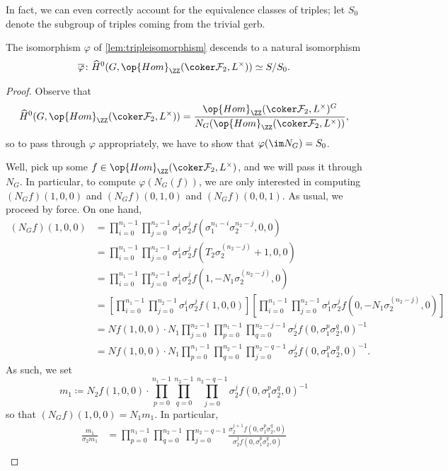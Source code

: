\documentclass{article}
\begin{document}
In fact, we can even correctly account for the equivalence classes of triples; let $S_0$ denote the subgroup of triples coming from the trivial gerb.
\begin{proposition}
	The isomorphism $\varphi$ of \autoref{lem:tripleisomorphism} descends to a natural isomorphism
	\[\overline\varphi\colon\widehat H^0(G,\op{Hom}_\ZZ(\coker\mathcal F_2,L^\times))\simeq S/S_0.\]
\end{proposition}
\begin{proof}
	Observe that
	\[\widehat H^0(G,\op{Hom}_\ZZ(\coker\mathcal F_2,L^\times))=\frac{\op{Hom}_\ZZ(\coker\mathcal F_2,L^\times)^G}{N_G(\op{Hom}_\ZZ(\coker\mathcal F_2,L^\times))},\]
	so to pass through $\varphi$ appropriately, we have to show that $\varphi(\im N_G)=S_0$.
	
	Well, pick up some $f\in\op{Hom}_\ZZ(\coker\mathcal F_2,L^\times)$, and we will pass it through $N_G$. In particular, to compute $\varphi(N_G(f))$, we are only interested in computing $(N_Gf)(1,0,0)$ and $(N_Gf)(0,1,0)$ and $(N_Gf)(0,0,1)$. As usual, we proceed by force. On one hand,
	\begin{align*}
		(N_Gf)(1,0,0) &= \prod_{i=0}^{n_1-1}\prod_{j=0}^{n_2-1}\sigma_1^{i}\sigma_2^{j}f\left(\sigma_1^{n_1-i}\sigma_2^{n_2-j},0,0\right) \\
		&= \prod_{i=0}^{n_1-1}\prod_{j=0}^{n_2-1}\sigma_1^{i}\sigma_2^{j}f\left(T_2\sigma_2^{(n_2-j)}+1,0,0\right) \\
		&= \prod_{i=0}^{n_1-1}\prod_{j=0}^{n_2-1}\sigma_1^{i}\sigma_2^{j}f\left(1,-N_1\sigma_2^{(n_2-j)},0\right) \\
		&= \left[\prod_{i=0}^{n_1-1}\prod_{j=0}^{n_2-1}\sigma_1^{i}\sigma_2^{j}f(1,0,0)\right]\left[\prod_{i=0}^{n_1-1}\prod_{j=0}^{n_2-1}\sigma_1^{i}\sigma_2^{j}f\left(0,-N_1\sigma_2^{(n_2-j)},0\right)\right] \\
		&= Nf(1,0,0)\cdot N_1\prod_{j=0}^{n_2-1}\prod_{p=0}^{n_1-1}\prod_{q=0}^{n_2-j-1}\sigma_2^{j}f\left(0,\sigma_1^p\sigma_2^q,0\right)^{-1} \\
		&= Nf(1,0,0)\cdot N_1\prod_{p=0}^{n_1-1}\prod_{q=0}^{n_2-1}\prod_{j=0}^{n_2-q-1}\sigma_2^{j}f\left(0,\sigma_1^p\sigma_2^q,0\right)^{-1}.
	\end{align*}
	As such, we set
	\[m_1\coloneqq N_2f(1,0,0)\cdot\prod_{p=0}^{n_1-1}\prod_{q=0}^{n_2-1}\prod_{j=0}^{n_2-q-1}\sigma_2^{j}f\left(0,\sigma_1^p\sigma_2^q,0\right)^{-1}\]
	so that $(N_Gf)(1,0,0)=N_1m_1$. In particular,
	\begin{align*}
		\frac{m_1}{\sigma_2m_1} &= \prod_{p=0}^{n_1-1}\prod_{q=0}^{n_2-1}\prod_{j=0}^{n_2-q-1}\frac{\sigma_2^{j+1}f\left(0,\sigma_1^p\sigma_2^q,0\right)}{\sigma_2^{j}f\left(0,\sigma_1^p\sigma_2^q,0\right)} \\

\end{align*}
\end{proof}
\end{document}
